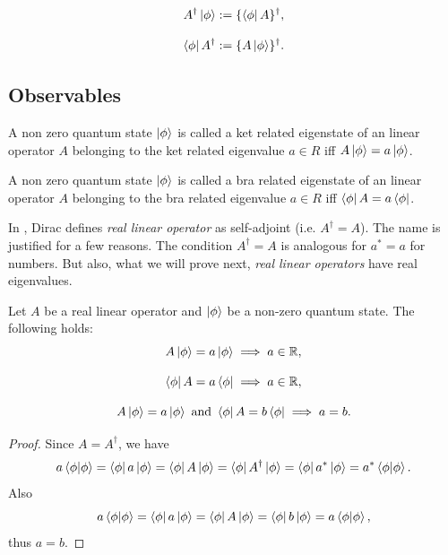 \documentclass[main.tex]{subfiles}
\begin{document}
\begin{equation}
A^\dagger \ket{\phi}:= \{\bra{\phi}A\}^\dagger,
\end{equation}

\begin{equation}
\bra{\phi} A^\dagger:= \{A\ket{\phi}\}^\dagger.
\end{equation}

\subsection{Observables}

\begin{definition}
A non zero quantum state $\ket{\phi}$ is called a ket related eigenstate of an linear operator $A$ belonging to the ket related eigenvalue $a \in R$ iff $A\ket{\phi} = a\ket{\phi}$.
\end{definition}

\begin{definition}
A non zero quantum state $\ket{\phi}$ is called a bra related eigenstate of an linear operator $A$ belonging to the bra related eigenvalue $a \in R$ iff $\bra{\phi}A = a\bra{\phi}$.
\end{definition}

In \cite{dirac1981}, Dirac defines \textit{real linear operator} as self-adjoint (i.e. $A^\dagger = A$). The name is justified for a few reasons. The condition $A^\dagger = A$ is analogous for $a^* = a$ for numbers. But also, what we will prove next, \textit{real linear operators} have real eigenvalues.

\begin{proposition}
Let $A$ be a real linear operator and $\ket{\phi}$ be a non-zero quantum state. The following holds:
\begin{equation}
A\ket{\phi} = a\ket{\phi} \implies a\in\mathbb{R},
\end{equation}

\begin{equation}
\bra{\phi} A = a\bra{\phi} \implies a\in\mathbb{R},
\end{equation}

\begin{equation}
A\ket{\phi} = a\ket{\phi} \text{ and } \bra{\phi} A = b\bra{\phi} \implies a = b.
\end{equation}

\end{proposition}
\begin{proof}
Since $A = A^\dagger$, we have
\begin{equation}
a\bra{\phi}\ket{\phi} = \bra{\phi} a \ket{\phi} = \bra{\phi} A \ket{\phi} = \bra{\phi} A^\dagger \ket{\phi} = \bra{\phi} a^* \ket{\phi} = a^* \bra{\phi}\ket{\phi}.
\end{equation}
Also
\begin{equation}
a\bra{\phi}\ket{\phi} = \bra{\phi} a \ket{\phi} = \bra{\phi} A \ket{\phi} = \bra{\phi} b \ket{\phi} = a\bra{\phi}\ket{\phi},
\end{equation}
thus $a = b$.
\end{proof}
\end{document}
